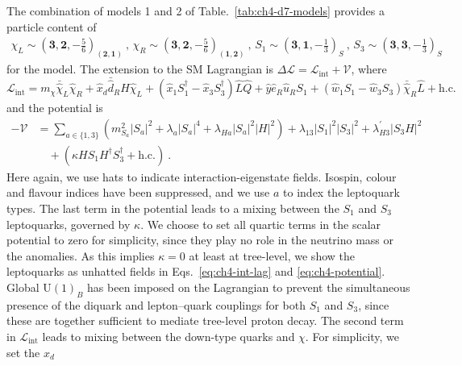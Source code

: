 The combination of models 1 and 2 of Table.~\ref{tab:ch4-d7-models} provides a particle content of
\begin{align*}
\chi_{L} \sim (\textbf{3}, \textbf{2}, -\tfrac{5}{6})_{(\mathbf{2}, \mathbf{1})} \ , \, \chi_{R} \sim (\textbf{3}, \textbf{2}, -\tfrac{5}{6})_{(\mathbf{1}, \mathbf{2})} \ , \,
S_{1} \sim ({\textbf{3}}, \textbf{1}, -\tfrac{1}{3})_S \ , \, S_{3} \sim  (\textbf{3}, \textbf{3}, -\tfrac{1}{3})_S
\end{align*}
for the model. The extension to the SM Lagrangian is
$\Delta \mathscr{L} = \mathscr{L}_{\text{int}} + \mathscr{V}$, where
\begin{equation}
  \label{eq:ch4-int-lag}
  \mathscr{L}_{\text{int}} = m_{\chi} \bar{\hat{\chi}}_{L} \hat{\chi}_{R} + \hat{x}_{d} \bar{\hat{d}}_{R} H \hat{\chi}_{L} + (\hat{x}_{1} S_{1}^{\dagger} - \hat{x}_{3} S_{3}^{\dagger}) \hat{L} \hat{Q} + \hat{y} \hat{e}_{R} \hat{u}_{R} S_{1} + (\hat{w}_{1} S_{1} - \hat{w}_{3} S_{3}) \bar{\hat{\chi}}_{R} \hat{L} + \text{h.c.}
\end{equation}
and the potential is
\begin{equation}
  \label{eq:ch4-potential}
  \begin{aligned}
    -\mathscr{V} &= \sum_{a \in \{1, 3\}} \left(m_{S_{a}}^{2} |S_{a}|^{2} + \lambda_{a} |S_{a}|^{4} + \lambda_{Ha} |S_{a}|^{2} |H|^{2}\right) + \lambda_{13} |S_{1}|^{2} |S_{3}|^{2} + \lambda_{H3}^{\prime} |S_{3} H|^{2} \\
    &\quad + (\kappa H S_{1} H^{\dagger} S_{3}^{\dagger} + \text{h.c.}) \ .
  \end{aligned}
\end{equation}
Here again, we use hats to indicate interaction-eigenstate fields. Isospin,
colour and flavour indices have been suppressed, and we use $a$ to index the
leptoquark types. The last term in the potential leads to a mixing between the
$S_{1}$ and $S_{3}$ leptoquarks, governed by $\kappa$. We choose to set all
quartic terms in the scalar potential to zero for simplicity, since they play no
role in the neutrino mass or the anomalies. As this implies $\kappa = 0$ at
least at tree-level, we show the leptoquarks as unhatted fields in
Eqs.~\eqref{eq:ch4-int-lag} and \eqref{eq:ch4-potential}. Global
$\mathrm{U}(1)_{B}$ has been imposed on the Lagrangian to prevent the
simultaneous presence of the diquark and lepton--quark couplings for both
$S_{1}$ and $S_{3}$, since these are together sufficient to mediate tree-level
proton decay. The second term in $\mathscr{L}_{\text{int}}$ leads to mixing
between the down-type quarks and $\chi$. For simplicity, we set the $x_{d}$
